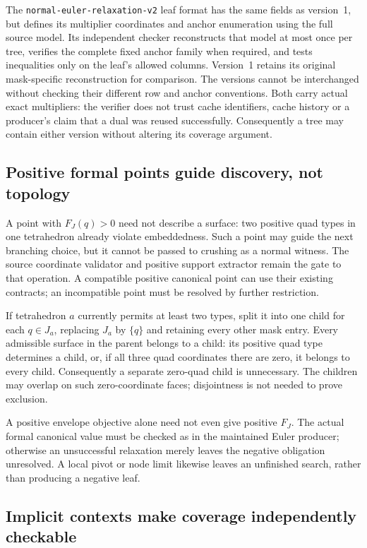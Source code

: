 The \texttt{normal-euler-relaxation-v2} leaf format has the same fields as
version~1, but defines its multiplier coordinates and anchor enumeration
using the full source model.  Its independent checker reconstructs that
model at most once per tree, verifies the complete fixed anchor family
when required, and tests inequalities only on the leaf's allowed columns.
Version~1 retains its original mask-specific reconstruction for comparison.
The versions cannot be interchanged without checking their different row
and anchor conventions.  Both carry actual exact multipliers: the verifier
does not trust cache identifiers, cache history or a producer's claim that
a dual was reused successfully.  Consequently a tree may contain either
version without altering its coverage argument.

\subsection{Positive formal points guide discovery, not topology}

A point with $F_J(q)>0$ need not describe a surface: two positive quad types
in one tetrahedron already violate embeddedness.  Such a point may guide
the next branching choice, but it cannot be passed to crushing as a normal
witness.  The source coordinate validator and positive support extractor
remain the gate to that operation.  A compatible positive canonical point
can use their existing contracts; an incompatible point must be resolved
by further restriction.

If tetrahedron $a$ currently permits at least two types, split it into one
child for each $q\in J_a$, replacing $J_a$ by $\{q\}$ and retaining every
other mask entry.  Every admissible surface in the parent belongs to a
child: its positive quad type determines a child, or, if all three quad
coordinates there are zero, it belongs to every child.  Consequently a
separate zero-quad child is unnecessary.  The children may overlap on such
zero-coordinate faces; disjointness is not needed to prove exclusion.

A positive envelope objective alone need not even give positive $F_J$.
The actual formal canonical value must be checked as in the maintained
Euler producer; otherwise an unsuccessful relaxation merely leaves the
negative obligation unresolved.  A local pivot or node limit likewise
leaves an unfinished search, rather than producing a negative leaf.

\subsection{Implicit contexts make coverage independently checkable}

